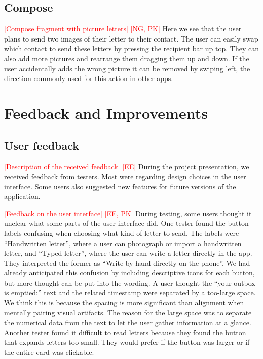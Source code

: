 \documentclass[acmlarge, review=false, screen=true]{acmart}
\begin{document}
    \subsection{Compose}
      \textcolor{red}{[Compose fragment with picture letters] [NG, PK]} \newline
      Here we see that the user plans to send two images of their letter to their contact. The user can easily swap which contact to send these letters by pressing the recipient bar up top. They can also add more pictures and rearrange them dragging them up and down. If the user accidentally adds the wrong picture it can be removed by swiping left, the direction commonly used for this action in other apps.


  \section{Feedback and Improvements}
    \subsection{User feedback}
      \textcolor{red}{[Description of the received feedback] [EE]} \newline
      During the project presentation, we received feedback from testers. Most were regarding design choices in the user interface. Some users also suggested new features for future versions of the application.

      \textcolor{red}{[Feedback on the user interface] [EE, PK]} \newline
      During testing, some users thought it unclear what some parts of the user interface did. One tester found the button labels confusing when choosing what kind of letter to send. The labels were “Handwritten letter”, where a user can photograph or import a handwritten letter, and “Typed letter”, where the user can write a letter directly in the app. They interpreted the former as “Write by hand directly on the phone”. We had already anticipated this confusion by including descriptive icons for each button, but more thought can be put into the wording. A user thought the “your outbox is emptied:” text and the related timestamp were separated by a too-large space. We think this is because the spacing is more significant than alignment when mentally pairing visual artifacts\cite{lecturenotes-interaktion}. The reason for the large space was to separate the numerical data from the text to let the user gather information at a glance.
      Another tester found it difficult to read letters because they found the button that expands letters too small. They would prefer if the button was larger or if the entire card was clickable.
\end{document}
